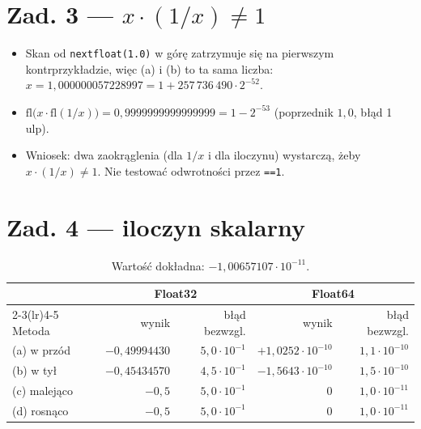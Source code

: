 \documentclass[10pt,a4paper]{article}
\begin{document}
\section*{Zad. 3 --- $x\cdot(1/x)\neq1$}

\begin{itemize}
\item Skan od \texttt{nextfloat(1.0)} w górę zatrzymuje się na pierwszym kontrprzykładzie, więc (a) i (b) to ta sama liczba:\\
$x=1{,}000000057228997=1+257\,736\,490\cdot2^{-52}$.
\item $\mathrm{fl}\bigl(x\cdot\mathrm{fl}(1/x)\bigr)=0{,}9999999999999999=1-2^{-53}$ (poprzednik $1{,}0$, błąd 1 ulp).
\item Wniosek: dwa zaokrąglenia (dla $1/x$ i dla iloczynu) wystarczą, żeby $x\cdot(1/x)\ne1$. Nie testować odwrotności przez \texttt{==1}.
\end{itemize}

\section*{Zad. 4 --- iloczyn skalarny}

\begin{table}[!htbp]
\centering\small
\setlength{\tabcolsep}{5pt}
\begin{tabular}{lrrrr}
\toprule
 & \multicolumn{2}{c}{Float32} & \multicolumn{2}{c}{Float64}\\
\cmidrule(lr){2-3}\cmidrule(lr){4-5}
Metoda & wynik & błąd bezwzgl. & wynik & błąd bezwzgl.\\
\midrule
(a) w przód & $-0{,}49994430$ & $5{,}0\cdot10^{-1}$ & $+1{,}0252\cdot10^{-10}$ & $1{,}1\cdot10^{-10}$\\
(b) w tył & $-0{,}45434570$ & $4{,}5\cdot10^{-1}$ & $-1{,}5643\cdot10^{-10}$ & $1{,}5\cdot10^{-10}$\\
(c) malejąco & $-0{,}5$ & $5{,}0\cdot10^{-1}$ & $0$ & $1{,}0\cdot10^{-11}$\\
(d) rosnąco & $-0{,}5$ & $5{,}0\cdot10^{-1}$ & $0$ & $1{,}0\cdot10^{-11}$\\
\bottomrule
\end{tabular}
\caption{Wartość dokładna: $-1{,}00657107\cdot10^{-11}$.}
\end{table}
\end{document}
